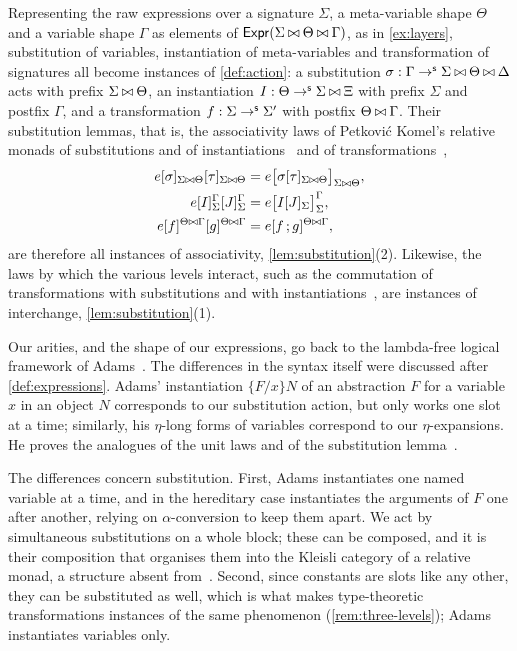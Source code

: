 \begin{remark}\label{rem:three-levels}
    Representing the raw expressions over a signature $\Sigma$, a meta-variable shape $\Theta$ and a variable shape $\Gamma$ as elements of $\mathsf{Expr}(\Sigma \mathbin{\bowtie} \Theta \mathbin{\bowtie} \Gamma)$, as in \cref{ex:layers}, substitution of variables, instantiation of meta-variables and transformation of signatures all become instances of \cref{def:action}: a substitution $\sigma : \Gamma \to^{\mathsf{s}} \Sigma \mathbin{\bowtie} \Theta \mathbin{\bowtie} \Delta$ acts with prefix $\Sigma \mathbin{\bowtie} \Theta$, an instantiation $I : \Theta \to^{\mathsf{s}} \Sigma \mathbin{\bowtie} \Xi$ with prefix $\Sigma$ and postfix $\Gamma$, and a transformation $f : \Sigma \to^{\mathsf{s}} \Sigma'$ with postfix $\Theta \mathbin{\bowtie} \Gamma$. Their substitution lemmas, that is, the associativity laws of Petković Komel's relative monads of substitutions and of instantiations~\cite[\S\S7.2 and~7.3]{PetkovicKomel2021} and of transformations~\cite[Lemma~8.3.4]{PetkovicKomel2021},
    \begin{align*}
        e[\sigma]_{\Sigma \mathbin{\bowtie} \Theta}[\tau]_{\Sigma \mathbin{\bowtie} \Theta} &= e\big[\sigma[\tau]_{\Sigma \mathbin{\bowtie} \Theta}\big]_{\Sigma \mathbin{\bowtie} \Theta},\\
        e[I]_\Sigma^\Gamma[J]_\Sigma^\Gamma &= e\big[I[J]_\Sigma\big]_\Sigma^\Gamma,\\
        e[f]^{\Theta \mathbin{\bowtie} \Gamma}[g]^{\Theta \mathbin{\bowtie} \Gamma} &= e[f \,; g]^{\Theta \mathbin{\bowtie} \Gamma},
    \end{align*}
    are therefore all instances of associativity, \cref{lem:substitution}(2). Likewise, the laws by which the various levels interact, such as the commutation of transformations with substitutions and with instantiations~\cite[Lemmas~8.3.2 and~8.3.3]{PetkovicKomel2021}, are instances of interchange, \cref{lem:substitution}(1).
\end{remark}

\begin{remark}\label{rem:adams}
    Our arities, and the shape of our expressions, go back to the lambda-free logical framework of Adams~\cite{Adams2008}. The differences in the syntax itself were discussed after \cref{def:expressions}. Adams' instantiation $\{F/x\}N$ of an abstraction $F$ for a variable $x$ in an object $N$ corresponds to our substitution action, but only works one slot at a time; similarly, his $\eta$-long forms of variables correspond to our $\eta$-expansions. He proves the analogues of the unit laws and of the substitution lemma~\cite[Lemmas~3.3 and~3.4]{Adams2008}.
    
    The differences concern substitution. First, Adams instantiates one named variable at a time, and in the hereditary case instantiates the arguments of $F$ one after another, relying on $\alpha$-conversion to keep them apart. We act by simultaneous substitutions on a whole block; these can be composed, and it is their composition that organises them into the Kleisli category of a relative monad, a structure absent from~\cite{Adams2008}. Second, since constants are slots like any other, they can be substituted as well, which is what makes type-theoretic transformations instances of the same phenomenon (\cref{rem:three-levels}); Adams instantiates variables only.
\end{remark}

